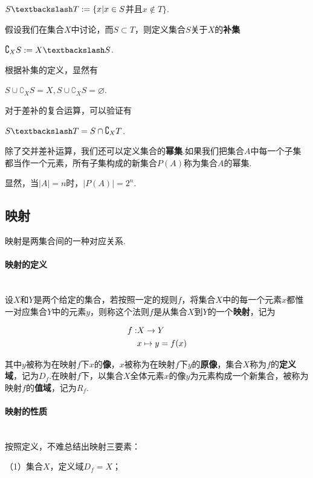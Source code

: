 \documentclass{ctexbook}
\begin{document}
	\centerline{$S\textbackslash T:=\{ x|x\in S$并且$x\notin T \}$.}
	
	假设我们在集合$X$中讨论，而$S \subset T$，则定义集合$S$关于$X$的\textbf{补集}
	
	\centerline{$\complement_X S:=X\textbackslash S$.}
	
	根据补集的定义，显然有
	
	\centerline{$S \cup \complement_X S=X,S \cup \complement_X S=\varnothing$.}
	
	对于差补的复合运算，可以验证有
	
	\centerline{$S\textbackslash T=S \cap \complement_X T$.}
	
	除了交并差补运算，我们还可以定义集合的\textbf{幂集}.如果我们把集合$A$中每一个子集都当作一个元素，所有子集构成的新集合$P(A)$称为集合$A$的幂集.
	
	显然，当$|A|=n$时，$|P(A)|=2^n$.
	
	\subsection{映射}
	映射是两集合间的一种对应关系.
	
	\paragraph{映射的定义}~{}
	\\
	\indent
	设$X$和$Y$是两个给定的集合，若按照一定的规则$f$，将集合$X$中的每一个元素$x$都惟一对应集合$Y$中的元素$y$，则称这个法则$f$是从集合$X$到$Y$的一个\textbf{映射}，记为
	
	\begin{equation}
		\begin{split}
			f:&X\rightarrow Y\notag   \\
			&x\mapsto y=f(x)\notag 
		\end{split}
	\end{equation}
	
	其中$y$被称为在映射$f$下$x$的\textbf{像}，$x$被称为在映射$f$下$y$的\textbf{原像}，集合$X$称为$f$的\textbf{定义域}，记为$D_f$.在映射$f$下，以集合$X$全体元素$x$的像$y$为元素构成一个新集合，被称为映射$f$的\textbf{值域}，记为$R_f$.
	
	\paragraph{映射的性质}~{}
	\\
	\indent
	按照定义，不难总结出映射三要素：
	
	（1）集合$X$，定义域$D_f=X$；
	
\end{document}
